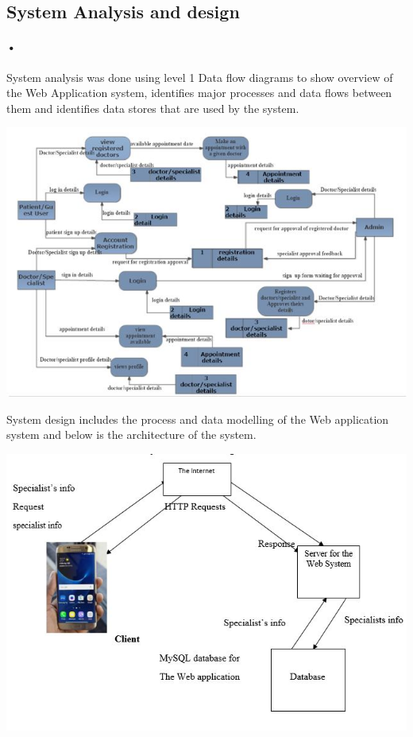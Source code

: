 \documentclass[12pt]{article}
\begin{document}
\subsection{System Analysis and design}  
\paragraph{•}System analysis was done using level 1 Data flow diagrams to show overview of the Web Application system, identifies major processes and data flows between them and identifies data stores that are used by the system.
 
\begin{center}
\includegraphics[scale=0.5]{dfd}
\end{center}

 System design includes the process and data modelling of the Web application system and below is the architecture of the system.
 
\begin{center}
\includegraphics[scale=0.5]{architecture}
\end{center}
\end{document}
